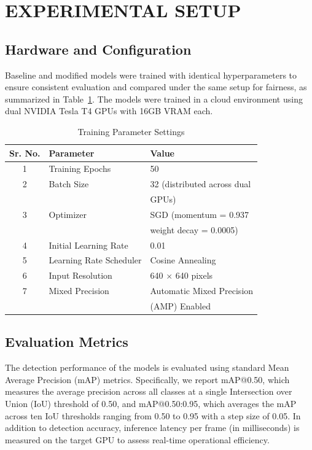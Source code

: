 \documentclass[sigconf]{acmart}
\begin{document}
\section{EXPERIMENTAL SETUP}

\subsection{Hardware and Configuration}

Baseline and modified models were trained with identical hyperparameters to ensure consistent evaluation and compared under the same setup for fairness, as summarized in Table~\ref{tab:param}. The models were trained in a cloud environment using dual NVIDIA Tesla T4 GPUs with 16GB VRAM each. 
\begin{table}[h]
\centering
\caption{Training Parameter Settings}
\label{tab:param}
\begin{tabular}{|c|l|l|}
\hline
\textbf{Sr. No.} & \textbf{Parameter} & \textbf{Value} \\ 
\hline
1 & Training Epochs & 50 \\ 
\hline
2 & Batch Size & 32 (distributed across dual \\ 
&&  GPUs)\\
\hline
3 & Optimizer & SGD (momentum = 0.937\\ 
&&  weight decay = 0.0005) \\
\hline
4 & Initial Learning Rate & 0.01 \\ 
\hline
5 & Learning Rate Scheduler & Cosine Annealing \\ 
\hline
6 & Input Resolution & 640 $\times$ 640 pixels \\ 
\hline
7 & Mixed Precision & Automatic Mixed Precision  \\ 

&&(AMP) Enabled\\
\hline
\end{tabular}
\end{table}

\subsection{Evaluation Metrics}
The detection performance of the models is evaluated using standard Mean Average Precision (mAP) metrics. Specifically, we report mAP@0.50, which measures the average precision across all classes at a single Intersection over Union (IoU) threshold of 0.50, and mAP@0.50:0.95, which averages the mAP across ten IoU thresholds ranging from 0.50 to 0.95 with a step size of 0.05. In addition to detection accuracy, inference latency per frame (in milliseconds) is measured on the target GPU to assess real-time operational efficiency.
\end{document}
